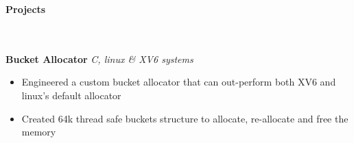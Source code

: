 \documentclass[]{article}
\newcommand{\lineunder} {
    \vspace*{-8pt} \\
    \hrulefill \\
}
\newcommand{\header} [1] {
    {\vspace*{6pt} \fontsize{12}{12}\selectfont \textbf{#1}}
     \lineunder
}
\begin{document}


\vspace{-3mm}
\header{Projects}
\vspace{1mm}
{\hspace{2mm}\textbf{Bucket Allocator}} {\sl C, linux \& XV6 systems} \\
\vspace{-3mm}
\begin{itemize}
        \setlength\itemsep{-1mm}
        \item Engineered a custom bucket allocator that can out-perform both XV6 and linux's default allocator
        \item Created 64k thread safe buckets structure to allocate, re-allocate and free the memory
\end{itemize}
\end{document}

